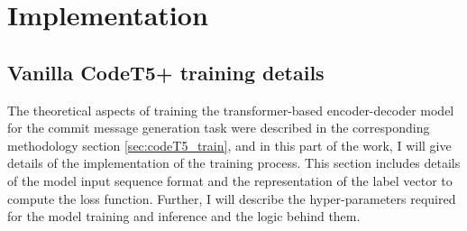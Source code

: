 \chapter{Implementation}\label{chap:impl}

\section{Vanilla CodeT5+ training details}
The theoretical aspects of training the transformer-based encoder-decoder model for the commit message generation task were described in the corresponding methodology section \ref{sec:codeT5_train}, and in this part of the work, I will give details of the implementation of the training process. This section includes details of the model input sequence format and the representation of the label vector to compute the loss function. Further, I will describe the hyper-parameters required for the model training and inference and the logic behind them.
